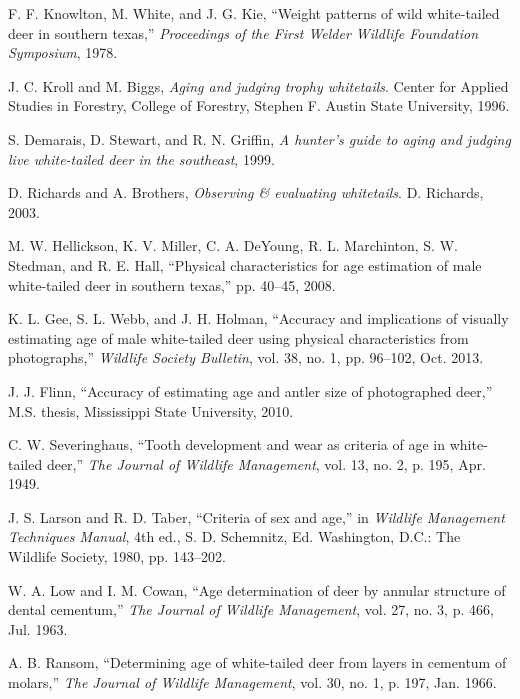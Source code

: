 \documentclass[11pt]{article}
\begin{document}
\begin{thebibliography}{99}

 F. F. Knowlton, M. White, and J. G. Kie, ``Weight patterns of wild white-tailed deer in southern texas,'' \textit{Proceedings of the First Welder Wildlife Foundation Symposium}, 1978.

 J. C. Kroll and M. Biggs, \textit{Aging and judging trophy whitetails}. Center for Applied Studies in Forestry, College of Forestry, Stephen F. Austin State University, 1996.

 S. Demarais, D. Stewart, and R. N. Griffin, \textit{A hunter's guide to aging and judging live white-tailed deer in the southeast}, 1999.

 D. Richards and A. Brothers, \textit{Observing \& evaluating whitetails}. D. Richards, 2003.

 M. W. Hellickson, K. V. Miller, C. A. DeYoung, R. L. Marchinton, S. W. Stedman, and R. E. Hall, ``Physical characteristics for age estimation of male white-tailed deer in southern texas,'' pp. 40--45, 2008.

 K. L. Gee, S. L. Webb, and J. H. Holman, ``Accuracy and implications of visually estimating age of male white-tailed deer using physical characteristics from photographs,'' \textit{Wildlife Society Bulletin}, vol. 38, no. 1, pp. 96--102, Oct. 2013.

 J. J. Flinn, ``Accuracy of estimating age and antler size of photographed deer,'' M.S. thesis, Mississippi State University, 2010.

 C. W. Severinghaus, ``Tooth development and wear as criteria of age in white-tailed deer,'' \textit{The Journal of Wildlife Management}, vol. 13, no. 2, p. 195, Apr. 1949.

 J. S. Larson and R. D. Taber, ``Criteria of sex and age,'' in \textit{Wildlife Management Techniques Manual}, 4th ed., S. D. Schemnitz, Ed. Washington, D.C.: The Wildlife Society, 1980, pp. 143--202.

 W. A. Low and I. M. Cowan, ``Age determination of deer by annular structure of dental cementum,'' \textit{The Journal of Wildlife Management}, vol. 27, no. 3, p. 466, Jul. 1963.

 A. B. Ransom, ``Determining age of white-tailed deer from layers in cementum of molars,'' \textit{The Journal of Wildlife Management}, vol. 30, no. 1, p. 197, Jan. 1966.


\end{thebibliography}
\end{document}
